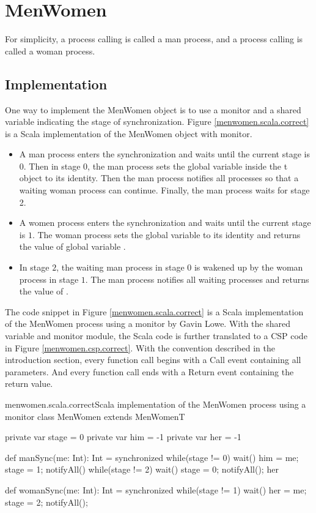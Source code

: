 \documentclass{article}
\begin{document}
\section{MenWomen}
For simplicity, a process calling  is called a man process, and a process calling  is called a woman process. 

\subsection{Implementation}
One way to implement the MenWomen object is to use a monitor and a shared variable indicating the stage of synchronization. Figure \ref{menwomen.scala.correct} is a Scala implementation of the MenWomen object with monitor.
\begin{itemize}
  \item A man process enters the synchronization and waits until the current stage is $0$. Then in stage $0$, the man process sets the global variable  inside the t object to its identity. Then the man process notifies all processes so that a waiting woman process can continue. Finally, the man process waits for stage 2.
  \item A women process enters the synchronization and waits until the current stage is $1$. The woman process sets the global variable  to its identity and returns the value of global variable .
  \item In stage $2$, the waiting man process in stage $0$ is wakened up by the woman process in stage $1$. The man process notifies all waiting processes and returns the value of .
\end{itemize}

The code snippet in Figure \ref{menwomen.scala.correct} is a Scala implementation of the MenWomen process using a monitor by Gavin Lowe. With the shared variable and monitor module, the Scala code is further translated to a CSP code in Figure \ref{menwomen.csp.correct}. With the convention described in the introduction section, every function call begins with a Call event containing all parameters. And every function call ends with a Return event containing the return value.

\begin{scalainline}{menwomen.scala.correct}{Scala implementation of the MenWomen process using a monitor}
class MenWomen extends MenWomenT{
  private var stage = 0
  private var him = -1
  private var her = -1

  def manSync(me: Int): Int = synchronized{
    while(stage != 0) wait()         
    him = me; stage = 1; notifyAll() 
    while(stage != 2) wait()
    stage = 0; notifyAll(); her
  }

  def womanSync(me: Int): Int = synchronized{
    while(stage != 1) wait()
    her = me; stage = 2; notifyAll();
  }
}
\end{scalainline}
\end{document}
